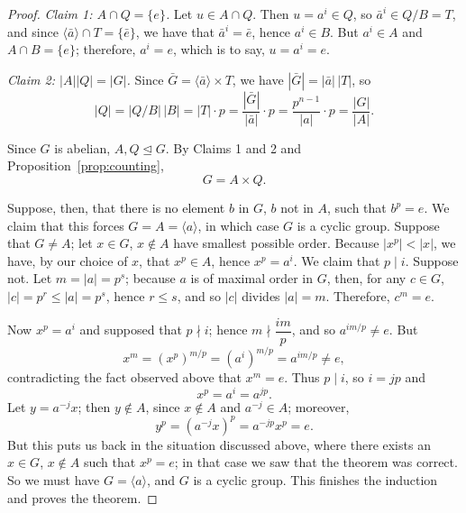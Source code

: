 \documentclass[11pt,a4paper]{article}
\begin{document}
\begin{proof}
		\vspace{0.5em}
		\noindent \emph{Claim 1: $A \cap Q = \{e\}$.} Let $u \in A \cap Q$. Then $u = a^i \in Q$, so $\bar{a}^i \in Q/B = T$, and since $\langle \bar{a} \rangle \cap T = \{\bar{e}\}$, we have that $\bar{a}^i = \bar{e}$, hence $a^i \in B$. But $a^i \in A$ and $A \cap B = \{e\}$; therefore, $a^i = e$, which is to say, $u = a^i = e$.
		
		\vspace{0.5em}
		\noindent \emph{Claim 2: $|A||Q| = |G|$.} Since $\bar{G} = \langle \bar{a} \rangle \times T$, we have $|\bar{G}| = |\bar{a}|\,|T|$, so
		\[
		|Q| = |Q/B|\,|B| = |T| \cdot p = \frac{|\bar{G}|}{|\bar{a}|}\cdot p = \frac{p^{n-1}}{|a|}\cdot p = \frac{|G|}{|A|}.
		\]
		
		\vspace{0.5em}
		\noindent Since $G$ is abelian, $A, Q \trianglelefteq G$. By Claims 1 and 2 and Proposition~\ref{prop:counting},
		\[
		G = A \times Q.
		\]
		
		\vspace{0.5em}
		\noindent Suppose, then, that there is no element $b$ in $G$, $b$ not in $A$, such that $b^p = e$. We claim that this forces $G = A = \langle a \rangle$, in which case $G$ is a cyclic group. Suppose that $G \neq A$; let $x \in G$, $x \notin A$ have smallest possible order. Because $|x^p| < |x|$, we have, by our choice of $x$, that $x^p \in A$, hence $x^p = a^i$. We claim that $p \mid i$. Suppose not. Let $m = |a| = p^s$; because $a$ is of maximal order in $G$, then, for any $c \in G$, $|c| = p^r \leq |a| = p^s$, hence $r \leq s$, and so $|c|$ divides $|a| = m$. Therefore, $c^m = e$.
		
		\vspace{0.5em}
		\noindent Now $x^p = a^i$ and supposed that $p \nmid i$; hence $m \nmid \dfrac{im}{p}$, and so $a^{im/p} \neq e$. But
		\[
		x^m = (x^p)^{m/p} = (a^i)^{m/p} = a^{im/p} \neq e,
		\]
		contradicting the fact observed above that $x^m = e$. Thus $p \mid i$, so $i = jp$ and
		\[
		x^p = a^i = a^{jp}.
		\]
		Let $y = a^{-j}x$; then $y \notin A$, since $x \notin A$ and $a^{-j} \in A$; moreover,
		\[
		y^p = (a^{-j}x)^p = a^{-jp}x^p = e.
		\]
		But this puts us back in the situation discussed above, where there exists an $x \in G$, $x \notin A$ such that $x^p = e$; in that case we saw that the theorem was correct. So we must have $G = \langle a \rangle$, and $G$ is a cyclic group. This finishes the induction and proves the theorem.
	\end{proof}
	
\end{document}
